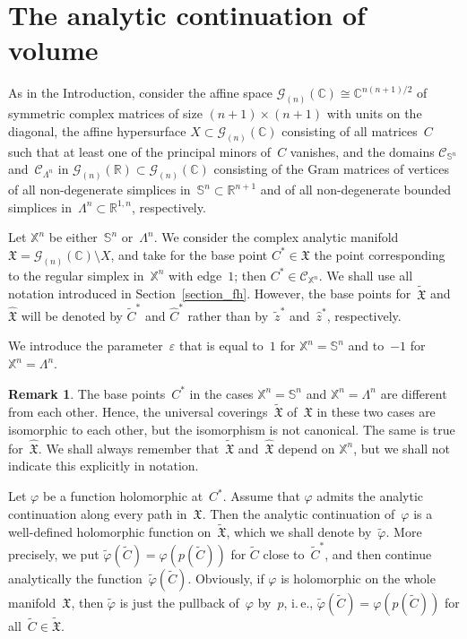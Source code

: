 \documentclass[reqno,tbtags,12pt]{amsart}
\numberwithin{equation}{section}
\newcommand{\R}{\mathbb{R}}
\newcommand{\CC}{\mathcal{C}}
\newcommand{\C}{\mathbb{C}}
\newcommand{\X}{\mathbb{X}}
\newcommand{\FX}{\mathfrak{X}}
\newcommand{\tFX}{\widetilde{\mathfrak{X}}}
\newcommand{\hFX}{\widehat{\mathfrak{X}}}
\newcommand{\bS}{\mathbb{S}}
\newcommand{\CG}{\mathcal{G}}
\newcommand{\tz}{\tilde{z}}
\newcommand{\hz}{\hat{z}}
\newcommand{\tC}{\widetilde{C}}
\newcommand{\hC}{\widehat{C}}
\theoremstyle{definition}
\newtheorem{remark}[theorem]{Remark}
\begin{document}
\section{The analytic continuation of volume}\label{section_continue}

 As in the Introduction, consider the affine space $\CG_{(n)}(\C)\cong \C^{n(n+1)/2}$ of symmetric complex matrices of size $(n+1)\times(n+1)$ with units on the diagonal, the affine hypersurface $X\subset \CG_{(n)}(\C)$ consisting of all matrices~$C$ such that at least one of the principal minors of~$C$ vanishes, and  the domains $\CC_{\bS^n}$ and~$\CC_{\Lambda^n}$ in $\CG_{(n)}(\R)\subset\CG_{(n)}(\C)$ consisting of the Gram matrices of vertices of all non-degenerate simplices in~$\bS^n\subset\R^{n+1}$ and of all non-degenerate bounded simplices in~$\Lambda^n\subset\R^{1,n}$, respectively. 
  
Let $\X^n$ be either~$\bS^n$ or~$\Lambda^n$. We consider the complex analytic manifold $\FX= \CG_{(n)}(\C)\setminus X$, and take for the base point $C^*\in\FX$ the point corresponding to the regular simplex in~$\X^n$ with edge~$1$; then $C^*\in\CC_{\X^n}$.  We shall use  all notation introduced in Section~\ref{section_fh}. However, the base points for~$\tFX$ and~$\hFX$ will be denoted by $\tC^*$ and $\hC^*$ rather than by~$\tz^*$ and~$\hz^*$, respectively.

We introduce the parameter~$\varepsilon$ that is equal to~$1$ for $\X^n=\bS^n$ and to~$-1$ for $\X^n=\Lambda^n$.

\begin{remark}
The base points~$C^*$  in the cases $\X^n=\bS^n$ and $\X^n=\Lambda^n$ are different from each other. Hence, the universal coverings~$\tFX$ of~$\FX$ in these two cases  are isomorphic to each other, but the isomorphism is not canonical. The same is true for~$\hFX$. We shall always remember that~$\tFX$ and~$\hFX$ depend on $\X^n$, but we shall not indicate this explicitly in notation. 
\end{remark}


Let $\varphi$ be a function holomorphic at~$C^*$. Assume that $\varphi$ admits the analytic continuation along every path in~$\FX$. Then the analytic continuation of~$\varphi$ is a well-defined holomorphic function  on~$\tFX$, which we shall denote by~$\widetilde{\varphi}$. More precisely, we put $\widetilde{\varphi}(\tC)=\varphi(p(\tC))$ for $\tC$ close to~$\tC^*$, and then continue analytically the function~$\widetilde{\varphi}(\tC)$. Obviously, if $\varphi$ is holomorphic on the whole manifold~$\FX$, then $\widetilde{\varphi}$ is just the pullback of~$\varphi$ by~$p$, i.\,e., $\widetilde{\varphi}(\tC)=\varphi(p(\tC))$ for all~$\tC\in\tFX$.
\end{document}
